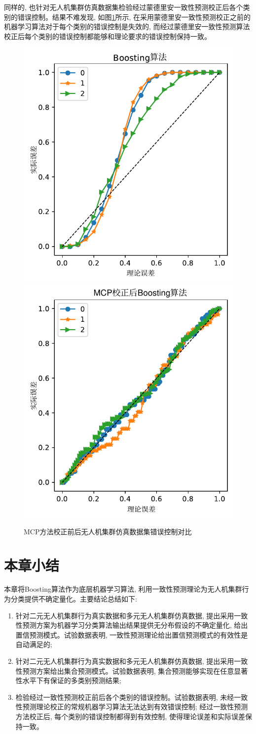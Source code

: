 同样的, 也针对无人机集群仿真数据集检验经过蒙德里安一致性预测校正后各个类别的错误控制。结果不难发现, 如图\ref{fig:sys-validity}所示, 在采用蒙德里安一致性预测校正之前的机器学习算法对于每个类别的错误控制是失效的, 而经过蒙德里安一致性预测算法校正后每个类别的错误控制都能够和理论要求的错误控制保持一致。
\begin{figure}[]
\centering
\includegraphics[width=.4\linewidth]{Img/chapter8/boost-invalidity}
\includegraphics[width=.4\linewidth]{Img/chapter8/boosting-validity}
\caption{MCP方法校正前后无人机集群仿真数据集错误控制对比}
\label{fig:sys-validity}
\end{figure}

\section{本章小结}
\label{sec:discussion}
本章将Boosting算法作为底层机器学习算法, 利用一致性预测理论为无人机集群行为分类提供不确定量化。主要结论总结如下:
\begin{enumerate}
\item 针对二元无人机集群行为真实数据和多元无人机集群仿真数据, 提出采用一致性预测方案为机器学习分类算法输出结果提供无分布假设的不确定量化, 给出置信预测模式。试验数据表明, 一致性预测理论给出置信预测模式的有效性是自动满足的;
\item 针对二元无人机集群行为真实数据和多元无人机集群仿真数据, 提出采用一致性预测方案给出集合预测模式。试验数据表明, 集合预测能够实现在任意显著性水平下有保证的多类别预测结果;
\item 检验经过一致性预测校正前后各个类别的错误控制。试验数据表明, 未经一致性预测理论校正的常规机器学习算法无法达到有效错误控制; 经过一致性预测方法校正后, 每个类别的错误控制都得到有效控制, 使得理论误差和实际误差保持一致。
\end{enumerate}
